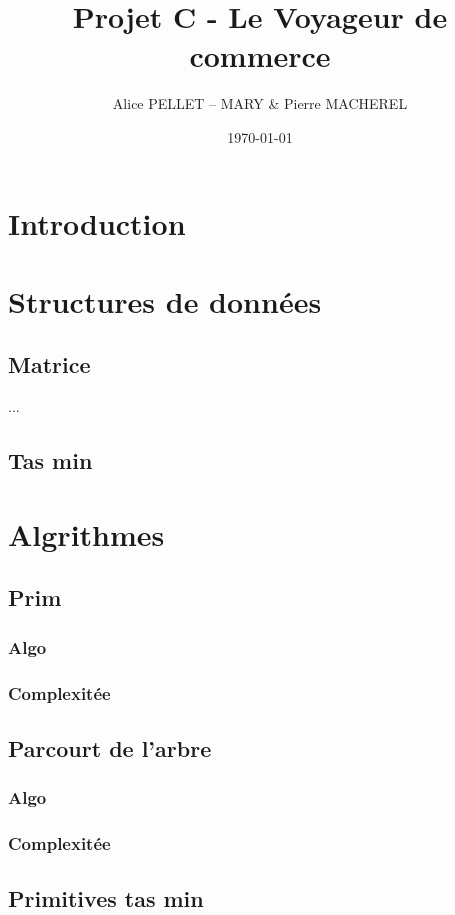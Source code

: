\documentclass[a4paper,11pt]{article}
\date{\today}
\title{Projet C - Le Voyageur de commerce}
\author{Alice PELLET -- MARY \& Pierre MACHEREL}
\begin{document}
\maketitle
\tableofcontents

\section*{Introduction} %

\section{Structures de données}

\subsection{Matrice} %
...

\subsection{Tas min} %


\section{Algrithmes}

\subsection{Prim} %
\subsubsection*{Algo}
\subsubsection*{Complexitée}

\subsection{Parcourt de l'arbre} %
\subsubsection*{Algo}
\subsubsection*{Complexitée}

\subsection{Primitives tas min} %
\end{document}

